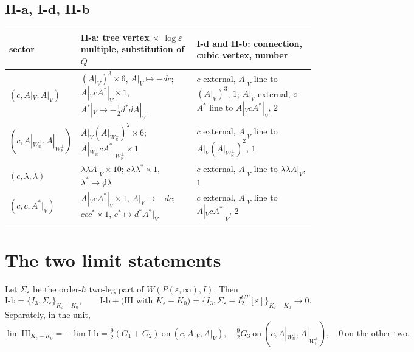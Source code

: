 \subsection{II-a, I-d, II-b}

\begin{tabular}{l|l|l}
sector & II-a: tree vertex $\times$ $\log\varepsilon$ multiple, substitution of $Q$ & I-d and II-b: connection, cubic vertex, number \\
\hline
$(c,A|_V,A|_V)$ & $(A|_V)^3\times6$, $A|_V\mapsto-dc$; $A|_VcA^*|_V\times1$, $A^*|_V\mapsto-\tfrac12d^*dA|_V$ & $c$ external, $A|_V$ line to $(A|_V)^3$, $1$; $A|_V$ external, $c$--$A^*$ line to $A|_VcA^*|_V$, $2$ \\
$(c,A|_{W_{\mathbb R}^\perp},A|_{W_{\mathbb R}^\perp})$ & $A|_V(A|_{W_{\mathbb R}^\perp})^2\times6$; $A|_{W_{\mathbb R}^\perp}cA^*|_{W_{\mathbb R}^\perp}\times1$ & $c$ external, $A|_V$ line to $A|_V(A|_{W_{\mathbb R}^\perp})^2$, $1$ \\
$(c,\lambda,\lambda)$ & $\lambda\lambda A|_V\times10$; $c\lambda\lambda^*\times1$, $\lambda^*\mapsto{\not d}\lambda$ & $c$ external, $A|_V$ line to $\lambda\lambda A|_V$, $1$ \\
$(c,c,A^*|_V)$ & $A|_VcA^*|_V\times1$, $A|_V\mapsto-dc$; $ccc^*\times1$, $c^*\mapsto d^*A^*|_V$ & $c$ external, $A|_V$ line to $A|_VcA^*|_V$, $2$ \\
\end{tabular}

\section{The two limit statements}

\begin{proposition}
\label{prop:s2c-lim1}
Let $\Sigma_\varepsilon$ be the order-$\hbar$ two-leg part of $W(P(\varepsilon,\infty),I)$. Then
\[
\text{I-b}=\{I_3,\Sigma_\varepsilon\}_{K_\varepsilon-K_0},\qquad \text{I-b}+\big(\text{III with }K_\varepsilon-K_0\big)=\{I_3,\Sigma_\varepsilon-I^{CT}_2[\varepsilon]\}_{K_\varepsilon-K_0}\longrightarrow0 .
\]
Separately, in the unit,
\[
\lim\text{III}_{K_\varepsilon-K_0}=-\lim\text{I-b}=\tfrac92(G_1+G_2)\ \text{on}\ (c,A|_V,A|_V),\quad \tfrac92G_3\ \text{on}\ (c,A|_{W_{\mathbb R}^\perp},A|_{W_{\mathbb R}^\perp}),\quad 0\ \text{on the other two}.
\]
\end{proposition}

